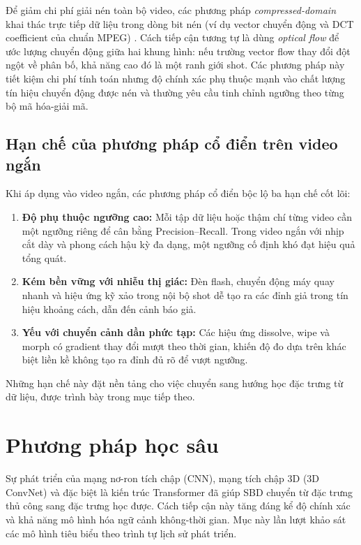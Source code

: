 Để giảm chi phí giải nén toàn bộ video, các phương pháp \textit{compressed-domain} khai thác trực tiếp dữ liệu trong dòng bit nén (ví dụ vector chuyển động và DCT coefficient của chuẩn MPEG) \cite{Kar2024_VideoSBD_IssuesChallengesSolutions}. Cách tiếp cận tương tự là dùng \textit{optical flow} để ước lượng chuyển động giữa hai khung hình: nếu trường vector flow thay đổi đột ngột về phân bố, khả năng cao đó là một ranh giới shot. Các phương pháp này tiết kiệm chi phí tính toán nhưng độ chính xác phụ thuộc mạnh vào chất lượng tín hiệu chuyển động được nén và thường yêu cầu tinh chỉnh ngưỡng theo từng bộ mã hóa-giải mã.

\subsection{Hạn chế của phương pháp cổ điển trên video ngắn}
Khi áp dụng vào video ngắn, các phương pháp cổ điển bộc lộ ba hạn chế cốt lõi:
\begin{enumerate}
    \item \textbf{Độ phụ thuộc ngưỡng cao:} Mỗi tập dữ liệu hoặc thậm chí từng video cần một ngưỡng riêng để cân bằng Precision--Recall. Trong video ngắn với nhịp cắt dày và phong cách hậu kỳ đa dạng, một ngưỡng cố định khó đạt hiệu quả tổng quát.
    \item \textbf{Kém bền vững với nhiễu thị giác:} Đèn flash, chuyển động máy quay nhanh và hiệu ứng kỹ xảo trong nội bộ shot dễ tạo ra các đỉnh giả trong tín hiệu khoảng cách, dẫn đến cảnh báo giả.
    \item \textbf{Yếu với chuyển cảnh dần phức tạp:} Các hiệu ứng dissolve, wipe và morph có gradient thay đổi mượt theo thời gian, khiến độ đo dựa trên khác biệt liền kề không tạo ra đỉnh đủ rõ để vượt ngưỡng.
\end{enumerate}
Những hạn chế này đặt nền tảng cho việc chuyển sang hướng học đặc trưng từ dữ liệu, được trình bày trong mục tiếp theo.

\section{Phương pháp học sâu}
\label{sec:deep_learning_methods}
Sự phát triển của mạng nơ-ron tích chập (CNN), mạng tích chập 3D (3D ConvNet) và đặc biệt là kiến trúc Transformer đã giúp SBD chuyển từ đặc trưng thủ công sang đặc trưng học được. Cách tiếp cận này tăng đáng kể độ chính xác và khả năng mô hình hóa ngữ cảnh không-thời gian. Mục này lần lượt khảo sát các mô hình tiêu biểu theo trình tự lịch sử phát triển.

